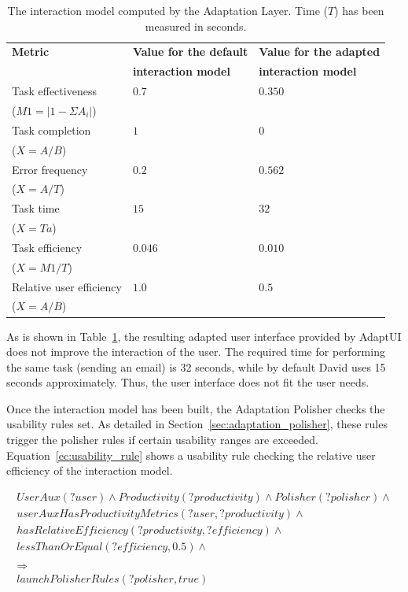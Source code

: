 \begin{table}
 \caption{The interaction model computed by the Adaptation Layer. Time ($T$) has
 been measured in seconds.}
 \label{tbl:model_comparison}
 \footnotesize
 \centering
\begin{tabular}{l l l}
  \hline 
  \textbf{Metric} 	& \textbf{Value for the default}& \textbf{Value for the adapted}\\
			& \textbf{interaction model} 	& \textbf{interaction model}	\\
  \hline
  Task effectiveness	& $0.7$				& $0.350$	\\
  ($M1=|1-\Sigma A_{i}|$)\\
  Task completion	& $1$				& $0$		\\
  ($X=A/B$)\\
  Error frequency 	& $0.2$				& $0.562$	\\	%
  ($X=A/T$)\\
  \hline
  Task time		& $15$				& $32$		\\
  ($X=Ta$)\\
  Task efficiency 	& $0.046$			& $0.010$	\\
  ($X=M1/T$)\\
  Relative user efficiency & $1.0$			& $0.5$		\\
  ($X=A/B$)\\
  \hline
\end{tabular}
\end{table}

As is shown in Table~\ref{tbl:model_comparison}, the resulting adapted user 
interface provided by AdaptUI does not improve the interaction of the user.
The required time for performing the same task (sending an email) is 32 seconds,
while by default David uses 15 seconds approximately. Thus, the user interface
does not fit the user needs. 

Once the interaction model has been built, the Adaptation Polisher checks the
usability rules set. As detailed in Section~\ref{sec:adaptation_polisher}, these
rules trigger the polisher rules if certain usability ranges are exceeded.
Equation~\ref{ec:usability_rule} shows a usability rule checking the relative
user efficiency of the interaction model.

\footnotesize
\begin{equation} \label{ec:usability_rule}
  \begin{align*} 
  UserAux(?user) ∧ Productivity(?productivity) ∧ Polisher(?polisher) ∧\\ 
  userAuxHasProductivityMetrics(?user, ?productivity) ∧ \\
  hasRelativeEfficiency(?productivity, ?efficiency) ∧ \\
  lessThanOrEqual(?efficiency, 0.5) ∧ \\
  \\
  \Rightarrow \\
  launchPolisherRules(?polisher, true)
  \end{align*}
\end{equation}
\normalsize

